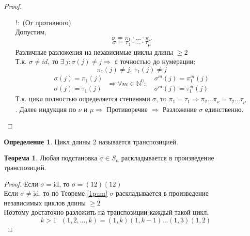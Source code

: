 \documentclass[a4paper, 12pt]{article}
\newcommand{\N}{\mathbb N}
\theoremstyle{definition}
\newtheorem*{definition}{Определение}
\newtheorem*{theorem}{Теорема}
\newtheorem*{properties}{Свойства}
\begin{document}
\begin{proof}
\begin{itemize}
\begin{properties}
    \end{properties}
    Продолжаем доказательство теоремы. Рассмотрим разложение $\{1,...,n\}$ как объединение $\textrm{Orb}$, где $k_i$ - количество элементов в $\textrm{Orb}$:
    $$\{1,...,n\} = \underset{k_1}{\textrm{Orb}(i_1)} \sqcup ... \sqcup \underset{k_t}{\textrm{Orb}(i_t)}\sqcup \underset{k_{t+1}}{\textrm{Orb}(i_{t+1})} \sqcup ... \sqcup \underset{k_s}{\textrm{Orb}(i_s)}$$ 
    Если $\sigma \neq \textrm{id}$, то $k_1>1,...,k_t>1,k_{t+1}=1,...,k_s=1 \Longrightarrow \\
    \sigma = (i_1 \ \sigma(i_1) \ ... \ \sigma^{k_1-1}(i_1)) \ ... \ (i_t \ \sigma(i_t) \ ... \ \sigma^{k_t-1}(i_t))$. $\exists$ \ доказано.   
    \item[ $!:$ ](От противного)\\
    Допустим, $$\sigma = \pi_1\cdot...\cdot \pi_{\nu}$$ $$\sigma = \tau_1\cdot...\cdot \tau_{\mu}$$  
    Различные разложения на независимые циклы длины $\geq 2$ \\
    Т.к. $\sigma \neq id$, то $\exists \ j: \sigma(j) \neq j \Longrightarrow $ с точностью до нумерации: \
    $$\pi_1(j) \neq j, \ \tau_1(j) \neq j$$  
    $$\begin{matrix}
      \sigma(j) = \pi_1(j) \\
      \sigma(j) = \tau_1(j)
    \end{matrix} \ \Longrightarrow \forall m \in \N^0: \  \ \ \begin{matrix}
      \sigma^m(j) = \pi_1^m(j) \\
      \sigma^m(j) = \tau_1^m(j)
    \end{matrix}$$ 
    Т.к. цикл полностью определяется степенями $\sigma$, то $\pi_1 = \tau_1 \Longrightarrow \pi_2 ... \pi_{\nu} = \tau_2 ... \tau_{\mu}$. Далее индукция по $\nu$ и $\mu \Longrightarrow $ Противоречие $\Longrightarrow $ Разложение $\sigma$ единственно.   
    \end{itemize}
  \end{proof} 
  \begin{definition}
    Цикл длины 2 называется транспозицией. 
  \end{definition}
  \begin{theorem}
    Любая подстановка $\sigma \in S_n$ раскладывается в произведение транспозиций. 
  \end{theorem} 
  \begin{proof}
    Если $\sigma = \textrm{id}$, то $\sigma = (12)(12)$ \\
    Если $\sigma \neq \textrm{id}$, то по Теореме \eqref{1pum} $\sigma$ раскладывается в произведение независимых циклов длины $\geq 2$ \\
    Поэтому достаточно разложить на транспозиции каждый такой цикл.
    $$k>1 \ \ \ (1,2,...,k) = (1,k)(1,k-1)...(1,3)(1,2)$$     
  \end{proof} 
\end{document}
